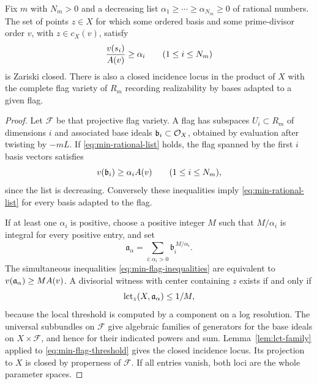 \begin{lemma}
\label{lem:min-flags}
Fix $m$ with $N_m>0$ and a decreasing list
$\alpha_1\geq\cdots\geq\alpha_{N_m}\geq0$ of rational numbers.
The set of points $z\in X$ for which some ordered basis and some
prime-divisor order $v$, with $z\in c_X(v)$, satisfy
\begin{equation}
\label{eq:min-rational-list}
 \frac{v(s_i)}{A(v)}\geq\alpha_i
       \qquad(1\leq i\leq N_m)
\end{equation}
is Zariski closed. There is also a closed incidence locus in the
product of $X$ with the complete flag variety of $R_m$ recording
realizability by bases adapted to a given flag.
\end{lemma}

\begin{proof}
Let $\mathcal F$ be that projective flag variety. A flag has subspaces
$U_i\subset R_m$ of dimensions $i$ and associated base ideals
$\mathfrak b_i\subset\mathcal O_X$, obtained by evaluation after twisting
by $-mL$. If \eqref{eq:min-rational-list} holds, the flag spanned by
the first $i$ basis vectors satisfies
\begin{equation}
\label{eq:min-flag-inequalities}
 v(\mathfrak b_i)\geq\alpha_iA(v)
       \qquad(1\leq i\leq N_m),
\end{equation}
since the list is decreasing. Conversely these inequalities imply
\eqref{eq:min-rational-list} for every basis adapted to the flag.

If at least one $\alpha_i$ is positive, choose a positive integer $M$
such that $M/\alpha_i$ is integral for every positive entry, and set
\[
 \mathfrak a_\alpha
    =\sum_{i:\alpha_i>0}\mathfrak b_i^{\,M/\alpha_i}.
\]
The simultaneous inequalities \eqref{eq:min-flag-inequalities} are
equivalent to $v(\mathfrak a_\alpha)\geq MA(v)$. A divisorial
witness with center containing $z$ exists if and only if
\begin{equation}
\label{eq:min-flag-threshold}
 \operatorname{lct}_z(X,\mathfrak a_\alpha)\leq1/M,
\end{equation}
because the local threshold is computed by a component on a log
resolution. The universal subbundles on $\mathcal F$ give algebraic
families of generators for the base ideals on $X\times\mathcal F$,
and hence for their indicated powers and sum. Lemma~\ref{lem:lct-family}
applied to \eqref{eq:min-flag-threshold} gives the closed incidence
locus. Its projection to $X$ is closed by properness of $\mathcal F$.
If all entries vanish, both loci are the whole parameter spaces.
\end{proof}

